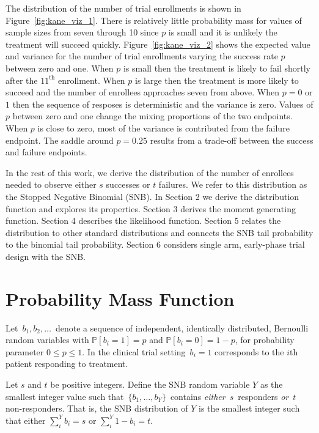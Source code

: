 \documentclass[sii]{ipart}
\begin{document}
The distribution of the number of trial enrollments is shown in 
Figure~\ref{fig:kane_viz_1}. There is relatively little probability mass
for values of sample sizes from seven through 10 since $p$ is small and it 
is unlikely the treatment will succeed quickly.
Figure~\ref{fig:kane_viz_2} shows the expected value and variance for the
number of trial enrollments varying the success rate $p$ between zero and one. When $p$ is small then the treatment
is likely to fail shortly after the $11^{\text{th}}$ enrollment.
When $p$ is large then the treatment is more likely to succeed and the 
number of enrollees approaches seven from above. 
When $p=0$ or $1$ then the sequence of resposes is deterministic and the 
variance is zero.
Values of $p$ between zero and one change the mixing proportions of 
the two endpoints. When $p$ is close to zero, most of the variance
is contributed from the failure endpoint. The saddle around $p=0.25$ results 
from a trade-off between the success and failure endpoints.

In the rest of this work, we derive the distribution of the number of 
enrollees needed
to observe either $s$ successes or $t$ failures. We refer to this distribution
as the Stopped Negative Binomial (SNB). 
In Section 2 we derive the distribution function and explores its properties.
Section 3 derives the moment generating function.
Section 4 describes the likelihood function.
Section 5 relates the distribution to other standard
distributions and connects the SNB tail probability to the binomial tail 
probability. Section 6 considers single arm, early-phase trial design with the 
SNB.

\section{Probability Mass Function}
\label{notation.section}

Let $\,b_1, b_2, \ldots \,$ denote a sequence of independent, identically
distributed, Bernoulli random variables with $\mathbb{P}[b_i=1]=p$ and
$\mathbb{P}[b_i = 0] = 1-p$, for
probability parameter $0\leq p \leq 1$. In the clinical trial setting
$\,b_i = 1$ corresponds to the $i$th patient responding to treatment.  

Let $s$ and $t$ be positive integers.  Define the SNB random
variable $Y$ as the smallest
integer value such that $\,\{b_1, \ldots , b_Y\}\,$ contains {\em either}
$\,s\,$ responders {\em or} $\,t\,$ non-responders. That is, the SNB 
distribution of $Y$ is the smallest integer such that either
$\sum_i^Y b_i = s$ or $\sum_i^Y 1-b_i = t$.
\end{document}
